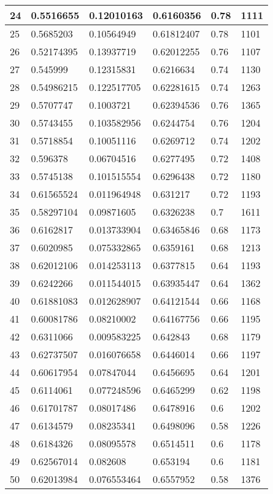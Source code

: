 \begin{longtable}{|l|l|l|l|l|l|}
24 & 0.5516655 & 0.12010163 & 0.6160356 & 0.78 & 1111 \\ \hline 
25 & 0.5685203 & 0.10564949 & 0.61812407 & 0.78 & 1101 \\ \hline 
26 & 0.52174395 & 0.13937719 & 0.62012255 & 0.76 & 1107 \\ \hline 
27 & 0.545999 & 0.12315831 & 0.6216634 & 0.74 & 1130 \\ \hline 
28 & 0.54986215 & 0.122517705 & 0.62281615 & 0.74 & 1263 \\ \hline 
29 & 0.5707747 & 0.1003721 & 0.62394536 & 0.76 & 1365 \\ \hline 
30 & 0.5743455 & 0.103582956 & 0.6244754 & 0.76 & 1204 \\ \hline 
31 & 0.5718854 & 0.10051116 & 0.6269712 & 0.74 & 1202 \\ \hline 
32 & 0.596378 & 0.06704516 & 0.6277495 & 0.72 & 1408 \\ \hline 
33 & 0.5745138 & 0.101515554 & 0.6296438 & 0.72 & 1180 \\ \hline 
34 & 0.61565524 & 0.011964948 & 0.631217 & 0.72 & 1193 \\ \hline 
35 & 0.58297104 & 0.09871605 & 0.6326238 & 0.7 & 1611 \\ \hline 
36 & 0.6162817 & 0.013733904 & 0.63465846 & 0.68 & 1173 \\ \hline 
37 & 0.6020985 & 0.075332865 & 0.6359161 & 0.68 & 1213 \\ \hline 
38 & 0.62012106 & 0.014253113 & 0.6377815 & 0.64 & 1193 \\ \hline 
39 & 0.6242266 & 0.011544015 & 0.63935447 & 0.64 & 1362 \\ \hline 
40 & 0.61881083 & 0.012628907 & 0.64121544 & 0.66 & 1168 \\ \hline 
41 & 0.60081786 & 0.08210002 & 0.64167756 & 0.66 & 1195 \\ \hline 
42 & 0.6311066 & 0.009583225 & 0.642843 & 0.68 & 1179 \\ \hline 
43 & 0.62737507 & 0.016076658 & 0.6446014 & 0.66 & 1197 \\ \hline 
44 & 0.60617954 & 0.07847044 & 0.6456695 & 0.64 & 1201 \\ \hline 
45 & 0.6114061 & 0.077248596 & 0.6465299 & 0.62 & 1198 \\ \hline 
46 & 0.61701787 & 0.08017486 & 0.6478916 & 0.6 & 1202 \\ \hline 
47 & 0.6134579 & 0.08235341 & 0.6498096 & 0.58 & 1226 \\ \hline 
48 & 0.6184326 & 0.08095578 & 0.6514511 & 0.6 & 1178 \\ \hline 
49 & 0.62567014 & 0.082608 & 0.653194 & 0.6 & 1181 \\ \hline 
50 & 0.62013984 & 0.076553464 & 0.6557952 & 0.58 & 1376 \\ \hline 
\end{longtable}